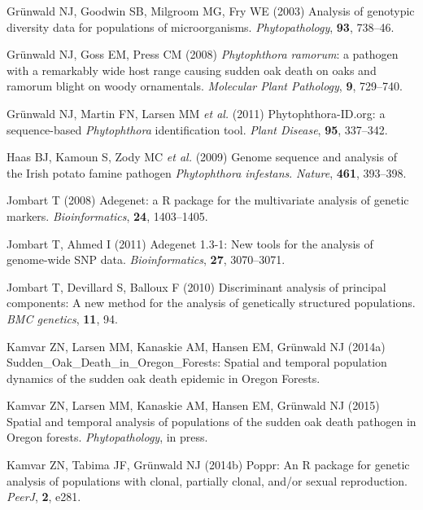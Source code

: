 \documentclass[double,12pt]{beavtex}
\begin{document}
  \hypertarget{ref-grunwald2003analysis}{}
  Grünwald NJ, Goodwin SB, Milgroom MG, Fry WE (2003) Analysis of
  genotypic diversity data for populations of microorganisms.
  \emph{Phytopathology}, \textbf{93}, 738--46.
  
  \hypertarget{ref-grunwald2008phytophthora}{}
  Grünwald NJ, Goss EM, Press CM (2008) \emph{Phytophthora ramorum}: a
  pathogen with a remarkably wide host range causing sudden oak death on
  oaks and ramorum blight on woody ornamentals. \emph{Molecular Plant
  Pathology}, \textbf{9}, 729--740.
  
  \hypertarget{ref-grunwald2011phytophthora}{}
  Grünwald NJ, Martin FN, Larsen MM \emph{et al.} (2011)
  Phytophthora-ID.org: a sequence-based \emph{Phytophthora} identification
  tool. \emph{Plant Disease}, \textbf{95}, 337--342.
  
  \hypertarget{ref-haas2009genome}{}
  Haas BJ, Kamoun S, Zody MC \emph{et al.} (2009) Genome sequence and
  analysis of the Irish potato famine pathogen \emph{Phytophthora
  infestans}. \emph{Nature}, \textbf{461}, 393--398.
  
  \hypertarget{ref-Jombartux5f2008}{}
  Jombart T (2008) Adegenet: a R package for the multivariate analysis of
  genetic markers. \emph{Bioinformatics}, \textbf{24}, 1403--1405.
  
  \hypertarget{ref-jombart2011adegenet}{}
  Jombart T, Ahmed I (2011) Adegenet 1.3-1: New tools for the analysis of
  genome-wide SNP data. \emph{Bioinformatics}, \textbf{27}, 3070--3071.
  
  \hypertarget{ref-jombart2010discriminant}{}
  Jombart T, Devillard S, Balloux F (2010) Discriminant analysis of
  principal components: A new method for the analysis of genetically
  structured populations. \emph{BMC genetics}, \textbf{11}, 94.
  
  \hypertarget{ref-kamvar2014sudden}{}
  Kamvar ZN, Larsen MM, Kanaskie AM, Hansen EM, Grünwald NJ (2014a)
  Sudden\_Oak\_Death\_in\_Oregon\_Forests: Spatial and temporal population
  dynamics of the sudden oak death epidemic in Oregon Forests.
  
  \hypertarget{ref-kamvar2015spatial}{}
  Kamvar ZN, Larsen MM, Kanaskie AM, Hansen EM, Grünwald NJ (2015) Spatial
  and temporal analysis of populations of the sudden oak death pathogen in
  Oregon forests. \emph{Phytopathology}, in press.
  
  \hypertarget{ref-kamvar2014poppr}{}
  Kamvar ZN, Tabima JF, Grünwald NJ (2014b) Poppr: An R package for
  genetic analysis of populations with clonal, partially clonal, and/or
  sexual reproduction. \emph{PeerJ}, \textbf{2}, e281.
  
\end{document}
